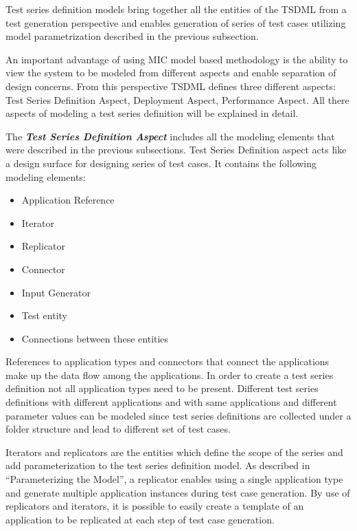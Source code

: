 Test series definition models bring together all the entities of the TSDML from a test generation perspective and enables generation of series of test cases utilizing model parametrization described in the previous subsection.

An important advantage of using MIC model based methodology is the ability to view the system to be modeled from different aspects and enable separation of design concerns. From this perspective TSDML defines three different aspects: Test Series Definition Aspect, Deployment Aspect, Performance Aspect. All there aspects of modeling a test series definition will be explained in detail.

The \textit{\textbf{Test Series Definition Aspect}} includes all the modeling elements that were described in the previous subsections. Test Series Definition aspect acts like a design surface for designing series of test cases. It contains the following modeling elements:

\begin{itemize}
	\item Application Reference
	\item Iterator
	\item Replicator
	\item Connector
	\item Input Generator
	\item Test entity
	\item Connections between these entities
\end{itemize}

References to application types and connectors that connect the applications make up the data flow among the applications. In order to create a test series definition not all application types need to be present. Different test series definitions with different applications and with same applications and different parameter values can be modeled since test series definitions are collected under a folder structure and lead to different set of test cases.

Iterators and replicators are the entities which define the scope of the series and add parameterization to the test series definition model. As described in "`Parameterizing the Model"', a replicator enables using a single application type and generate multiple application instances during test case generation. By use of replicators and iterators, it is possible to easily create a template of an application to be replicated at each step of test case generation.

